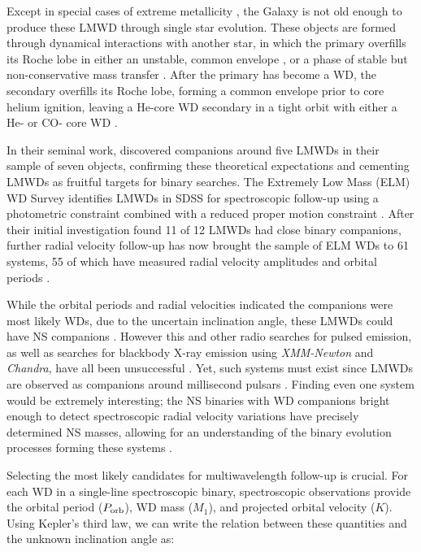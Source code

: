\documentclass[letterpaper,12pt,preprint]{aastex}
\begin{document}
Except in special cases of extreme metallicity \citep{kilic07}, the Galaxy is not old enough to produce these LMWD through single star evolution. These objects are formed through dynamical interactions with another star, in which the primary overfills its Roche lobe in either an unstable, common envelope \citep{vdSluys06}, or a phase of stable but non-conservative mass transfer \citep{woods12}. After the primary has become a WD, the secondary overfills its Roche lobe, forming a common envelope prior to core helium ignition, leaving a He-core WD secondary in a tight orbit with either a He- or CO- core WD \citep{han98}.


In their seminal work, \citet{marsh95} discovered companions around five LMWDs in their sample of seven objects, confirming these theoretical expectations and cementing LMWDs as fruitful targets for binary searches. The Extremely Low Mass (ELM) WD Survey identifies LMWDs in SDSS for spectroscopic follow-up using a photometric constraint combined with a reduced proper motion constraint \citep{ELMI}. After their initial investigation found 11 of 12 LMWDs had close binary companions, further radial velocity follow-up has now brought the sample of ELM WDs to 61 systems, 55 of which have measured radial velocity amplitudes and orbital periods \citep{ELMII, ELMIII, ELMIV, ELMV}.


While the orbital periods and radial velocities indicated the companions were most likely WDs, due to the uncertain inclination angle, these LMWDs could have NS companions \citep{vLeeuwen07}. However this and other radio searches for pulsed emission, as well as searches for blackbody X-ray emission using {\it XMM-Newton} and {\it Chandra}, have all been unsuccessful \citep{agueros09a,agueros09b,kilic13}. Yet, such systems must exist since LMWDs are observed as companions around millisecond pulsars \citep{vKerkwijk96,callanan98,bassa06,antoniadis12}. Finding even one system would be extremely interesting; the NS binaries with WD companions bright enough to detect spectroscopic radial velocity variations have precisely determined NS masses, allowing for an understanding of the binary evolution processes forming these systems . 


Selecting the most likely candidates for multiwavelength follow-up is crucial. For each WD in a single-line spectroscopic binary, spectroscopic observations provide the orbital period ($P_{\rm orb}$), WD mass ($M_1$), and projected orbital velocity ($K$). Using Kepler's third law, we can write the relation between these quantities and the unknown inclination angle as:
\end{document}
